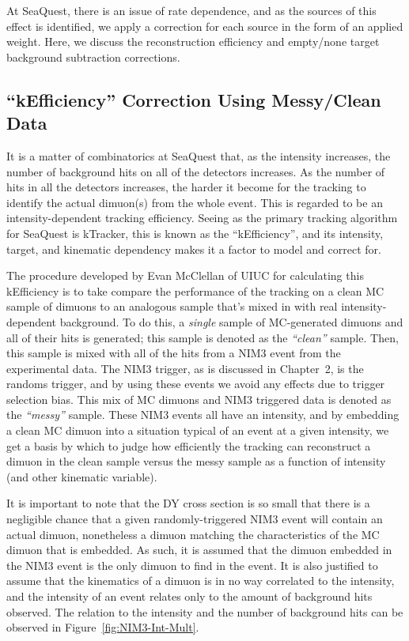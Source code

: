 At SeaQuest, there is an issue of rate dependence, and as the sources of this effect is identified, we apply a correction for each source in the form of an applied weight. Here, we discuss the reconstruction efficiency and empty/none target background subtraction corrections.

\subsection{``kEfficiency'' Correction Using Messy/Clean Data}

It is a matter of combinatorics at SeaQuest that, as the intensity increases, the number of background hits on all of the detectors increases. As the number of hits in all the detectors increases, the harder it become for the tracking to identify the actual dimuon(s) from the whole event. This is regarded to be an intensity-dependent tracking efficiency. Seeing as the primary tracking algorithm for SeaQuest is kTracker, this is known as the ``kEfficiency'', and its intensity, target, and kinematic dependency makes it a factor to model and correct for.

The procedure developed by Evan McClellan of UIUC for calculating this kEfficiency is to take compare the performance of the tracking on a clean MC sample of dimuons to an analogous sample that's mixed in with real intensity-dependent background. To do this, a \emph{single} sample of MC-generated dimuons and all of their hits is generated; this sample is denoted as the \emph{``clean''} sample. Then, this sample is mixed with all of the hits from a NIM3 event from the experimental data. The NIM3 trigger, as is discussed in Chapter~2, is the randoms trigger, and by using these events we avoid any effects due to trigger selection bias. This mix of MC dimuons and NIM3 triggered data is denoted as the \emph{``messy''} sample. These NIM3 events all have an intensity, and by embedding a clean MC dimuon into a situation typical of an event at a given intensity, we get a basis by which to judge how efficiently the tracking can reconstruct a dimuon in the clean sample versus the messy sample as a function of intensity (and other kinematic variable).

It is important to note that the DY cross section is so small that there is a negligible chance that a given randomly-triggered NIM3 event will contain an actual dimuon, nonetheless a dimuon matching the characteristics of the MC dimuon that is embedded. As such, it is assumed that the dimuon embedded in the NIM3 event is the only dimuon to find in the event. It is also justified to assume that the kinematics of a dimuon is in no way correlated to the intensity, and the intensity of an event relates only to the amount of background hits observed. The relation to the intensity and the number of background hits can be observed in Figure~\ref{fig:NIM3-Int-Mult}.

